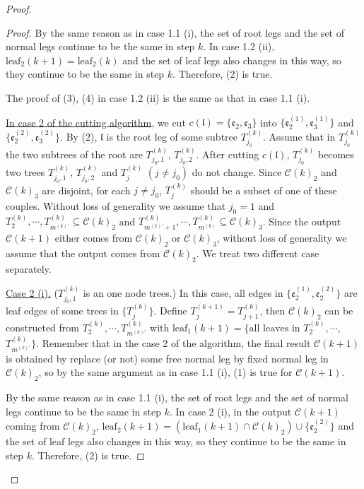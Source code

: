 \begin{proof}
\begin{proof}
By the same reason as in case 1.1 (i), the set of root legs and the set of normal legs continue to be the same in step $k$. In case 1.2 (ii), $\text{leaf}_2(k+1)=\text{leaf}_2(k)$ and the set of leaf legs also changes in this way, so they continue to be the same in step $k$. Therefore, (2) is true.

The proof of (3), (4) in case 1.2 (ii) is the same as that in case 1.1 (i).

\underline{In case 2 of the cutting algorithm}, we cut $c(\mathfrak{l})=\{\mathfrak{e}_2,\mathfrak{e}_3\}$ into $\{\mathfrak{e}_{2}^{(1)}, \mathfrak{e}_{3}^{(1)}\}$ and $\{\mathfrak{e}_{2}^{(2)}, \mathfrak{e}_{3}^{(2)}\}$. By (2), $\mathfrak{l}$ is the root leg of some subtree $T^{(k)}_{j_0}$. Assume that in $T^{(k)}_{j_0}$ the two subtrees of the root are $T^{(k)}_{j_0,1}$, $T^{(k)}_{j_0,2}$. After cutting $c(\mathfrak{l})$, $T^{(k)}_{j_0}$ becomes two trees $T^{(k)}_{j_0,1}$, $T^{(k)}_{j_0,2}$ and $T^{(k)}_{j}$ $(j\ne j_0)$ do not change. Since $\mathcal{C}(k)_{2}$ and $\mathcal{C}(k)_{3}$ are disjoint, for each $j\ne j_0$, $T^{(k)}_{j}$ should be a subset of one of these couples. Without loss of generality we assume that $j_0=1$ and $T^{(k)}_2, \cdots, T^{(k)}_{m^{(k)'}}\subseteq \mathcal{C}(k)_{2}$ and $T^{(k)}_{m^{(k)'}+1}, \cdots, T^{(k)}_{m^{(k)}}\subseteq \mathcal{C}(k)_{3}$. Since the output $\mathcal{C}(k+1)$ either comes from $\mathcal{C}(k)_{2}$ or $\mathcal{C}(k)_{3}$, without loss of generality we assume that the output comes from $\mathcal{C}(k)_{2}$. We treat two different case separately.

\underline{Case 2 (i).} ($T^{(k)}_{j_0,1}$ is an one node trees.) In this case, all edges in $\{\mathfrak{e}_{2}^{(1)}, \mathfrak{e}_{2}^{(2)}\}$ are leaf edges of some trees in $\{T_{j}^{(k)}\}$. Define $T^{(k+1)}_{j}=T^{(k)}_{j+1}$, then $\mathcal{C}(k)_2$ can be constructed from $T^{(k)}_2, \cdots, T^{(k)}_{m^{(k)'}}$ with $\text{leaf}_1(k+1)=\{\text{all leaves in }T^{(k)}_2, \cdots,$ $T^{(k)}_{m^{(k)'}}\}$. Remember that in the case 2 of the algorithm, the final result $\mathcal{C}(k+1)$ is obtained by replace (or not) some free normal leg by fixed normal leg in $\mathcal{C}(k)_2$, so by the same argument as in case 1.1 (i), (1) is true for $\mathcal{C}(k+1)$.

By the same reason as in case 1.1 (i), the set of root legs and the set of normal legs continue to be the same in step $k$. In case 2 (i), in the output $\mathcal{C}(k+1)$ coming from $\mathcal{C}(k)_2$, $\text{leaf}_2(k+1)=(\text{leaf}_1(k+1)\cap \mathcal{C}(k)_2)\cup \{ \mathfrak{e}_{2}^{(2)}\}$ and the set of leaf legs also changes in this way, so they continue to be the same in step $k$. Therefore, (2) is true.


\end{proof}
\end{proof}

